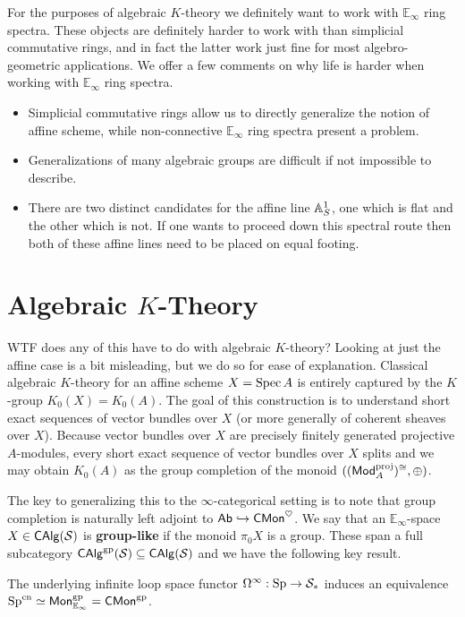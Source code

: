 \documentclass[11pt]{article}
\newcommand{\E}{\mathbb{E}}
\renewcommand{\S}{\mathcal{S}}
\DeclareMathOperator{\cn}{cn} %
\DeclareMathOperator{\gp}{gp} %
\DeclareMathOperator{\proj}{proj} %
\begin{document}
For the purposes of algebraic $K$-theory we definitely want to work with $\E_{\infty}$ ring spectra. These objects are definitely harder to work with than simplicial commutative rings, and in fact the latter work just fine for most algebro-geometric applications. We offer a few comments on why life is harder when working with $\E_{\infty}$ ring spectra.
\begin{itemize}
\item Simplicial commutative rings allow us to directly generalize the notion of affine scheme, while non-connective $\E_{\infty}$ ring spectra present a problem.

\item Generalizations of many algebraic groups are difficult if not impossible to describe.

\item There are two distinct candidates for the affine line $\mathbb{A}_S^1$, one which is flat and the other which is not. If one wants to proceed down this spectral route then both of these affine lines need to be placed on equal footing.
\end{itemize}

\section{Algebraic $K$-Theory}
WTF does any of this have to do with algebraic $K$-theory? Looking at just the affine case is a bit misleading, but we do so for ease of explanation. Classical algebraic $K$-theory for an affine scheme $X=\operatorname{Spec} A$ is entirely captured by the $K$-group $K_0(X)=K_0(A)$. The goal of this construction is to understand short exact sequences of vector bundles over $X$ (or more generally of coherent sheaves over $X$). Because vector bundles over $X$ are precisely finitely generated projective $A$-modules, every short exact sequence of vector bundles over $X$ splits and we may obtain $K_0(A)$ as the group completion of the monoid $((\Mod_A^{\proj})^{\iso},\oplus)$. 

The key to generalizing this to the $\infty$-categorical setting is to note that group completion is naturally left adjoint to $\operatorname{\mathsf{Ab}}\hookrightarrow\operatorname{\mathsf{CMon}}^{\heartsuit}$. We say that an $\E_{\infty}$-space $X\in\CAlg(\S)$ is \textbf{group-like} if the monoid $\pi_0X$ is a group. These span a full subcategory $\CAlg^{\gp}(\S)\subset\CAlg(\S)$ and we have the following key result.

\begin{theorem}
The underlying infinite loop space functor $\Omega^{\infty}: \Sp\to\S_*$ induces an equivalence $\Sp^{\cn}\simeq\Mon_{\E_{\infty}}^{\gp}=\CMon^{\gp}$.
\end{theorem}
\end{document}
